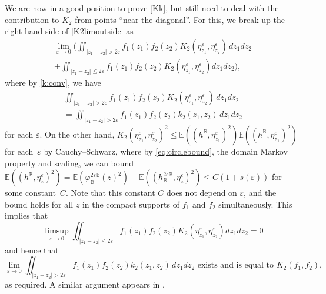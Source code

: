 \documentclass[JEP,XML,SOM,Unicode,published]{cedram}
\theoremstyle{definition}
\newcommand{\E}{\mathbb{E}}
\newcommand{\B}{\mathbb{B}}\let\D\B\let\Ub\B
\let\eps\varepsilon
\begin{document}
We are now in a good position to prove \eqref{Kk}, but still need to deal with the contribution to $K_2$ from points ``near the diagonal''. For this, we break up the right-hand side of \eqref{K2limoutside} as
\begin{multline*}
\lim_{\eps\to 0} \biggl(\iint_{|z_1-z_2|>2\eps}f_1(z_1)f_2(z_2)K_2(\eta_{z_1}^\eps, \eta_{z_2}^\eps)\, dz_1 dz_2\\ + \iint_{|z_1-z_2|\le 2\eps}f_1(z_1)f_2(z_2)K_2(\eta_{z_1}^\eps, \eta_{z_2}^\eps) dz_1 dz_2\biggr),
\end{multline*}
where by
\eqref{k:conv}, we have
\begin{multline*}
\iint_{|z_1-z_2|>2\eps}f_1(z_1)f_2(z_2)K_2(\eta_{z_1}^\eps, \eta_{z_2}^\eps)\, dz_1 dz_2\\
= \iint_{|z_1-z_2|>2\eps}f_1(z_1)f_2(z_2)k_2(z_1,z_2)\, dz_1 dz_2
\end{multline*}
for each $\eps$. On the other hand, $K_2(\eta_{z_1}^\eps, \eta_{z_2}^\eps)^2\le {\E((h^\B,\eta_{z_1}^\eps)^2)\E((h^\B,\eta_{z_1}^\eps)^2)}$ for each~$\eps$ by Cauchy--Schwarz, where by \eqref{eq:circlebound}, the domain Markov property and scaling, we can bound $\E((h^\B,\eta_{z}^\eps)^2)=\E(\varphi_\B^{2\eps\B}(z)^2)+\E((h_\B^{2\eps\B},\eta_z^\eps)^2)\le C(1+s(\eps))$ for some constant~$C$. Note that this constant $C$ does not depend on $\eps$, and the bound holds for all $z$ in the compact supports of $f_1$ and $f_2$ simultaneously. This implies that
\[
\limsup_{\eps\to 0} \iint_{|z_1-z_2|\le 2\eps}f_1(z_1)f_2(z_2)K_2(\eta_{z_1}^\eps, \eta_{z_2}^\eps) dz_1 dz_2=0
\]
and hence that
\[
\lim_{\eps\to 0} \iint_{|z_1-z_2|>2\eps}f_1(z_1)f_2(z_2)k_2(z_1,z_2)\, dz_1 dz_2 \text{ exists and is equal to } K_2(f_1,f_2),
\]
as required. A similar argument appears in \cite[Proof of Lem.\,2.18]{BPR18}.
\end{document}
